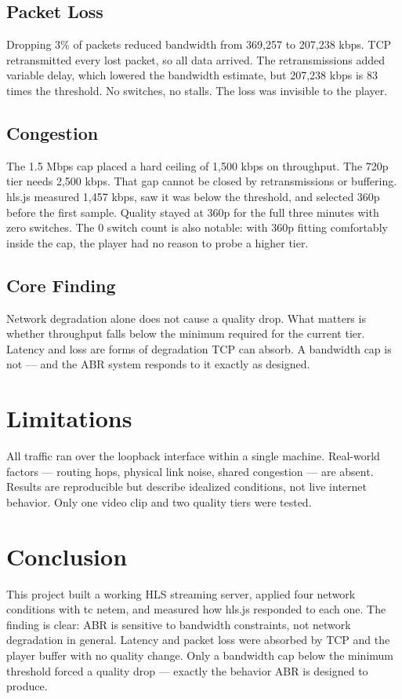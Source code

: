 \documentclass[12pt]{article}
\begin{document}
\subsection{Packet Loss}

Dropping 3\% of packets reduced bandwidth from 369,257 to 207,238 kbps. TCP retransmitted every lost packet, so all data arrived. The retransmissions added variable delay, which lowered the bandwidth estimate, but 207,238 kbps is 83 times the threshold. No switches, no stalls. The loss was invisible to the player.

\subsection{Congestion}

The 1.5 Mbps cap placed a hard ceiling of 1,500 kbps on throughput. The 720p tier needs 2,500 kbps. That gap cannot be closed by retransmissions or buffering. hls.js measured 1,457 kbps, saw it was below the threshold, and selected 360p before the first sample. Quality stayed at 360p for the full three minutes with zero switches. The 0 switch count is also notable: with 360p fitting comfortably inside the cap, the player had no reason to probe a higher tier.

\subsection{Core Finding}

Network degradation alone does not cause a quality drop. What matters is whether throughput falls below the minimum required for the current tier. Latency and loss are forms of degradation TCP can absorb. A bandwidth cap is not --- and the ABR system responds to it exactly as designed.

\section{Limitations}

All traffic ran over the loopback interface within a single machine. Real-world factors --- routing hops, physical link noise, shared congestion --- are absent. Results are reproducible but describe idealized conditions, not live internet behavior. Only one video clip and two quality tiers were tested.

\section{Conclusion}

This project built a working HLS streaming server, applied four network conditions with tc netem, and measured how hls.js responded to each one. The finding is clear: ABR is sensitive to bandwidth constraints, not network degradation in general. Latency and packet loss were absorbed by TCP and the player buffer with no quality change. Only a bandwidth cap below the minimum threshold forced a quality drop --- exactly the behavior ABR is designed to produce.
\end{document}
